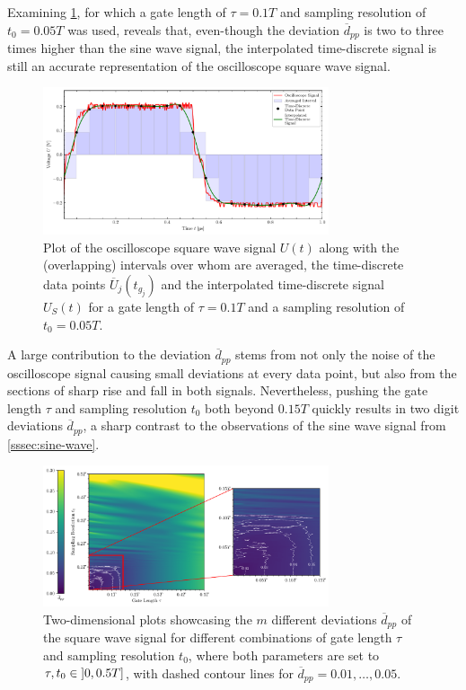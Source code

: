 Examining \cref{fig:square-real-i50-s25}, for which a gate length of $\tau = 0.1T$ and sampling resolution of $t_0 = 0.05T$ was used, reveals that, even-though the deviation $\overline{d}_{pp}$ is two to three times higher than the sine wave signal, the interpolated time-discrete signal is still an accurate representation of the oscilloscope square wave signal.
\begin{figure}[H]
	\centering
	\includegraphics[width=0.75\textwidth]{Figures/Signals/square_real_i50_s25.pdf}
	\caption{Plot of the oscilloscope square wave signal $U\left(t\right)$ along with the (overlapping) intervals over whom are averaged, the time-discrete data points $\overline{U}_j\left(t_{g_j}\right)$ and the interpolated time-discrete signal $U_S\left(t\right)$ for a gate length of $\tau = 0.1T$ and a sampling resolution of $t_0 = 0.05T$.}
	\label{fig:square-real-i50-s25}
\end{figure}
A large contribution to the deviation $\overline{d}_{pp}$ stems from not only the noise of the oscilloscope signal causing small deviations at every data point, but also from the sections of sharp rise and fall in both signals. Nevertheless, pushing the gate length $\tau$ and sampling resolution $t_0$ both beyond $0.15T$ quickly results in two digit deviations $\overline{d}_{pp}$, a sharp contrast to the observations of the sine wave signal from \cref{sssec:sine-wave}.
\begin{figure}[H]
	\centering
		\centering
	\includegraphics[width=0.75\textwidth]{Figures/Combinations/square_real.pdf}
	\caption{Two-dimensional plots showcasing the $m$ different deviations $\overline{d}_{pp}$ of the square wave signal for different combinations of gate length $\tau$ and sampling resolution $t_0$, where both parameters are set to $\tau, t_0 \in \interval[scaled, open left]{0}{0.5T}$, with dashed contour lines for $\overline{d}_{pp} = 0.01, \dotsc ,0.05$.}
	\label{fig:square-real-combination}
\end{figure}
